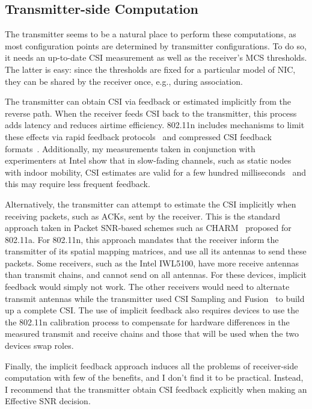 \subsection{Transmitter-side Computation}
The transmitter seems to be a natural place to perform these computations, as most configuration points are determined by transmitter configurations. To do so, it needs an up-to-date CSI measurement as well as the receiver's MCS thresholds. The latter is easy: since the thresholds are fixed for a particular model of NIC, they can be shared by the receiver once, e.g., during association.

The transmitter can obtain CSI via feedback or estimated implicitly from the reverse path. When the receiver feeds CSI back to the transmitter, this process adds latency and reduces airtime efficiency. 802.11n includes mechanisms to limit these effects via rapid feedback protocols~\cite[\S9.19.2]{80211n} and compressed CSI feedback formats~\cite[\S20.3.12.2.5]{80211n}. Additionally, my measurements taken in conjunction with experimenters at Intel show that in slow-fading channels, such as static nodes with indoor mobility, CSI estimates are valid for a few hundred milliseconds~\cite{Perahia_Doppler} and this may require less frequent feedback.

Alternatively, the transmitter can attempt to estimate the CSI implicitly when receiving packets, such as ACKs, sent by the receiver. This is the standard approach taken in Packet SNR-based schemes such as CHARM~\cite{Judd_CHARM} proposed for 802.11a. For 802.11n, this approach mandates that the receiver inform the transmitter of its spatial mapping matrices, and use all its antennas to send these packets. Some receivers, such as the Intel IWL5100, have more receive antennas than transmit chains, and cannot send on all antennas. For these devices, implicit feedback would simply not work. The other receivers would need to alternate transmit antennas while the transmitter used CSI Sampling and Fusion~\cite{Crepaldi_CSI_SF} to build up a complete CSI. The use of implicit feedback also requires devices to use the the 802.11n calibration process to compensate for hardware differences in the measured transmit and receive chains and those that will be used when the two devices swap roles.

Finally, the implicit feedback approach induces all the problems of receiver-side computation with few of the benefits, and I don't find it to be practical. Instead, I recommend that the transmitter obtain CSI feedback explicitly when making an Effective SNR decision.

